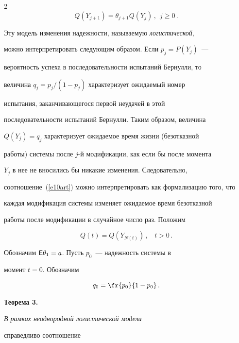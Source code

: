 \begin{multicols}{2}
\begin{equation}


Q(Y_{j+1})=\theta_{j+1}Q(Y_j)\,,\ \ j\ge0\,.


\label{e10art}


\end{equation}


Эту модель изменения надежности, называемую {\it логистической},


можно интерпретировать следующим образом. Если $p_j=P(Y_j)$~---


вероятность успеха в последовательности испытаний Бернулли, то


величина $q_j=p_j/(1-p_j)$ характеризует ожидаемый номер


испытания, заканчивающегося первой неудачей в этой


последовательности испытаний Бернулли. Таким образом, величина


$Q(Y_j)=q_j$ характеризует ожида\-емое время жизни (безотказной


работы) системы после $j$-й модификации, как если бы после момента


$Y_j$ в нее не вносились бы никакие изменения. Следовательно,


соотношение~(\ref{e10art}) можно интерпретировать как формализацию того, что


каждая модификация системы изменяет ожи\-да\-емое время безотказной


работы после модификации в случайное число раз. Положим


$$


Q(t)=Q(Y_{N(t)})\,,\ \ \ \ t>0\,.


$$


Обозначим ${\sf E}\theta_1=a$. Пусть $p_0$~--- надежность системы в


момент $t=0$. Обозначим


$$


q_0=\fr{p_0}{1-p_0}\,.


$$








\smallskip





\noindent


{\textbf{Теорема 3.}} {\it В рамках неоднородной логистической модели


справедливо соотношение}


$$



\end{multicols}
